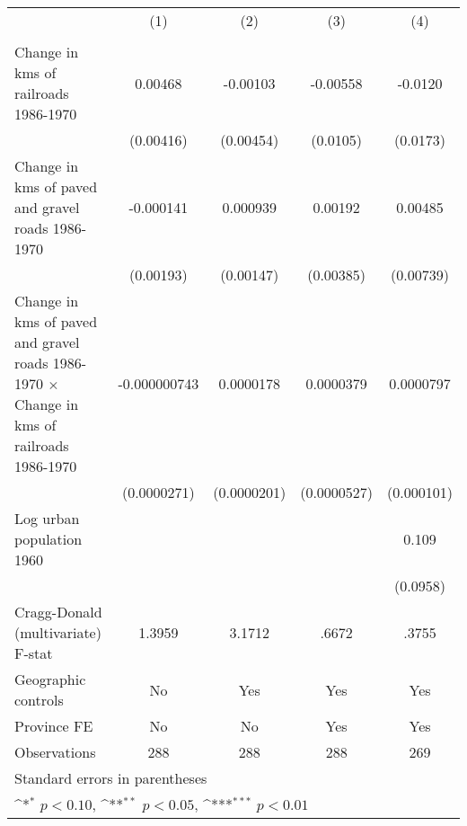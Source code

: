 {
\def\sym#1{\ifmmode^{#1}\else\(^{#1}\)\fi}
\begin{tabular}{l*{4}{c}}
\hline\hline
                &\multicolumn{1}{c}{(1)}&\multicolumn{1}{c}{(2)}&\multicolumn{1}{c}{(3)}&\multicolumn{1}{c}{(4)}\\
                &\multicolumn{1}{c}{}&\multicolumn{1}{c}{}&\multicolumn{1}{c}{}&\multicolumn{1}{c}{}\\
\hline
Change in kms of railroads 1986-1970&  0.00468         & -0.00103         & -0.00558         &  -0.0120         \\
                &(0.00416)         &(0.00454)         & (0.0105)         & (0.0173)         \\
[1em]
Change in kms of paved and gravel roads 1986-1970&-0.000141         & 0.000939         &  0.00192         &  0.00485         \\
                &(0.00193)         &(0.00147)         &(0.00385)         &(0.00739)         \\
[1em]
Change in kms of paved and gravel roads 1986-1970 $\times$ Change in kms of railroads 1986-1970&-0.000000743         &0.0000178         &0.0000379         &0.0000797         \\
                &(0.0000271)         &(0.0000201)         &(0.0000527)         &(0.000101)         \\
[1em]
Log urban population 1960&                  &                  &                  &    0.109         \\
                &                  &                  &                  & (0.0958)         \\
\hline
Cragg-Donald (multivariate) F-stat&   1.3959         &   3.1712         &    .6672         &    .3755         \\
Geographic controls&       No         &      Yes         &      Yes         &      Yes         \\
Province FE     &       No         &       No         &      Yes         &      Yes         \\
Observations    &      288         &      288         &      288         &      269         \\
\hline\hline
\multicolumn{5}{l}{\footnotesize Standard errors in parentheses}\\
\multicolumn{5}{l}{\footnotesize \sym{*} \(p<0.10\), \sym{**} \(p<0.05\), \sym{***} \(p<0.01\)}\\
\end{tabular}
}
